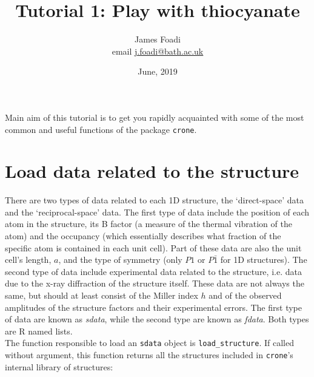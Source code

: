 \documentclass[12pt,a4paper]{article}\usepackage[]{graphicx}\usepackage[]{color}
\author{James Foadi \\ 
        email \href{mailto:j.foadi@bath.ac.uk}{j.foadi@bath.ac.uk}}
\date{June, 2019}
\title{Tutorial 1: Play with thiocyanate}
\begin{document}
\maketitle

\noindent Main aim of this tutorial is to get you rapidly acquainted with some of the most common and useful functions of the package \texttt{crone}.

\section{Load data related to the structure}
There are two types of data related to each 1D structure, the `direct-space' data and the `reciprocal-space' data. The first type of data include the position of each atom in the structure, its B factor (a measure of the thermal vibration of the atom) and the occupancy (which essentially describes what fraction of the specific atom is contained in each unit cell). Part of these data are also the unit cell's length, $a$, and the type of symmetry (only $P1$ or $P\bar{1}$ for 1D structures). The second type of data include experimental data related to the structure, i.e. data due to the x-ray diffraction of the structure itself. These data are not always the same, but should at least consist of the Miller index $h$ and of the observed amplitudes of the structure factors and their experimental errors. The first type of data are known as \emph{sdata}, while the second type are known as \emph{fdata}. Both types are R named lists.\\
\newline
\noindent The function responsible to load an \texttt{sdata} object is \texttt{load\_structure}. If called without argument, this function returns all the structures included in \texttt{crone}'s internal library of structures:
\end{document}
